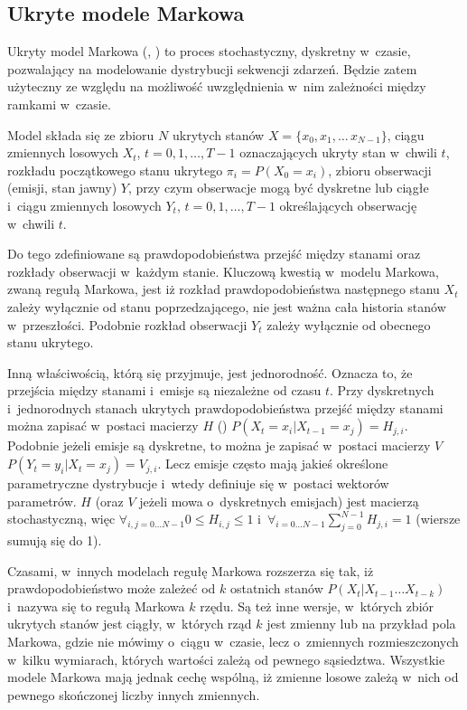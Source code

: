 \subsection{Ukryte modele Markowa}\label{sec:hmm}

Ukryty model Markowa (, ) to proces stochastyczny,
dyskretny w~czasie, pozwalający na modelowanie dystrybucji
sekwencji zdarzeń. Będzie zatem użyteczny ze względu na możliwość uwzględnienia w~nim zależności
między ramkami w~czasie.

Model składa się ze zbioru $N$ ukrytych stanów $X = \{x_0, x_1, \dots\, x_{N-1}\}$, ciągu zmiennych losowych
$X_t$, $t = 0, 1, \dots, T - 1$ oznaczających ukryty stan w~chwili $t$, rozkładu początkowego stanu ukrytego
$\pi_i = P(X_0 = x_i)$, zbioru obserwacji (emisji, stan jawny) $Y$, przy czym obserwacje mogą być dyskretne
lub ciągłe i~ciągu zmiennych losowych $Y_t$, $t = 0, 1, \dots, T - 1$ określających obserwację w~chwili $t$.

Do tego zdefiniowane są prawdopodobieństwa przejść między stanami oraz rozkłady obserwacji w~każdym stanie.
Kluczową kwestią w~modelu Markowa, zwaną regułą Markowa, jest iż rozkład prawdopodobieństwa następnego stanu $X_t$
zależy wyłącznie od stanu poprzedzającego, nie jest ważna cała historia stanów w~przeszłości. Podobnie rozkład
obserwacji $Y_t$ zależy wyłącznie od obecnego stanu ukrytego.

Inną właściwością, którą się przyjmuje, jest jednorodność. Oznacza to, że przejścia między stanami i~emisje są
niezależne od czasu $t$. Przy dyskretnych i~jednorodnych stanach ukrytych prawdopodobieństwa przejść
między stanami można zapisać w~postaci macierzy $H$ () $P(X_t = x_i | X_{t-1} = x_j) = H_{j, i}$.
Podobnie jeżeli emisje są dyskretne, to można je zapisać w~postaci macierzy $V$ $P(Y_t = y_i | X_t = x_j) = V_{j, i}$.
Lecz emisje często mają jakieś określone parametryczne dystrybucje i~wtedy definiuje się w~postaci wektorów parametrów.
$H$ (oraz $V$ jeżeli mowa o~dyskretnych emisjach) jest macierzą stochastyczną, więc $\forall_{i, j = 0 \dots N - 1} 0 \leq H_{i, j} \leq 1$ i~$\forall_{i = 0 \dots N - 1} \sum_{j = 0}^{N - 1} H_{j, i} = 1$ (wiersze sumują się do 1).

Czasami, w~innych modelach regułę Markowa rozszerza się tak, iż prawdopodobieństwo może zależeć od $k$ ostatnich stanów
$P(X_t | X_{t-1} \dots X_{t-k})$ i~nazywa się to regułą Markowa $k$ rzędu. Są też inne wersje, w~których zbiór
ukrytych stanów jest ciągły, w~których rząd $k$ jest zmienny lub na przykład pola Markowa,
gdzie nie mówimy o~ciągu w~czasie, lecz o~zmiennych rozmieszczonych
w~kilku wymiarach, których wartości zależą od pewnego sąsiedztwa. Wszystkie modele Markowa mają jednak cechę wspólną, iż
zmienne losowe zależą w~nich od pewnego skończonej liczby innych zmiennych.

